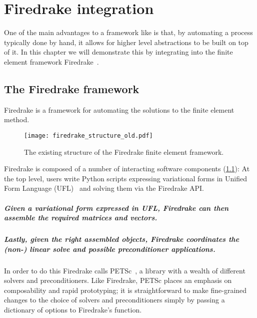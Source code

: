 \documentclass[thesis]{subfiles}
\begin{document}
\chapter{Firedrake integration}
\label{chapter:firedrake}

One of the main advantages to a framework like  is that, by automating a process typically done by hand, it allows for higher level abstractions to be built on top of it.
In this chapter we will demonstrate this by integrating  into the finite element framework Firedrake~\cite{FiredrakeUserManual}.

\section{The Firedrake framework}

Firedrake is a framework for automating the solutions to the finite element method.

\begin{figure}
  \texttt{[image: firedrake\_structure\_old.pdf]}
  \caption{
    The existing structure of the Firedrake finite element framework.
  }
  \label{fig:firedrake_structure_old}
\end{figure}

Firedrake is composed of a number of interacting software components (\cref{fig:firedrake_structure_old}):
At the top level, users write Python scripts expressing variational forms in Unified Form Language (UFL)~\cite{alnaesUnifiedFormLanguage2014a} and solving them via the Firedrake API.

\paragraph{Given a variational form expressed in UFL, Firedrake can then assemble the required matrices and vectors.}

\paragraph{Lastly, given the right assembled objects, Firedrake coordinates the (non-) linear solve and possible preconditioner applications.}
In order to do this Firedrake calls PETSc~\cite{petsc-user-ref,petsc-web-page,petsc-efficient}, a library with a wealth of different solvers and preconditioners.
Like Firedrake, PETSc places an emphasis on composability and rapid prototyping; it is straightforward to make fine-grained changes to the choice of solvers and preconditioners simply by passing a dictionary of options to Firedrake's  function.
\end{document}
